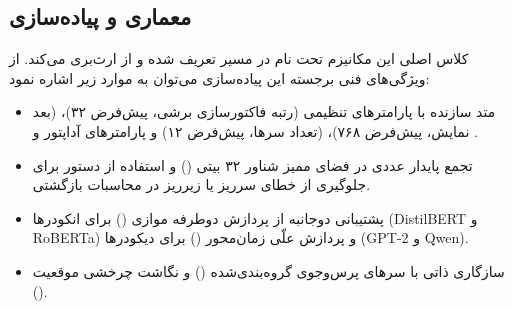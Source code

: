 \subsection{معماری و پیاده‌سازی}
کلاس اصلی این مکانیزم تحت نام  در مسیر  تعریف شده و از  ارث‌بری می‌کند. از ویژگی‌های فنی برجسته این پیاده‌سازی می‌توان به موارد زیر اشاره نمود:
\begin{itemize}
    \item متد سازنده با پارامترهای تنظیمی  (رتبه فاکتورسازی برشی، پیش‌فرض ۳۲)،  (بعد نمایش، پیش‌فرض ۷۶۸)،  (تعداد سرها، پیش‌فرض ۱۲) و پارامترهای آداپتور  و .
    \item تجمع پایدار عددی در فضای ممیز شناور ۳۲ بیتی () و استفاده از دستور  برای جلوگیری از خطای سرریز یا زیرریز در محاسبات بازگشتی.
    \item پشتیبانی دوجانبه از پردازش دوطرفه موازی () برای انکودرها (DistilBERT و RoBERTa) و پردازش علّی زمان‌محور () برای دیکودرها (GPT-2 و Qwen).
    \item سازگاری ذاتی با سرهای پرس‌وجوی گروه‌بندی‌شده () و نگاشت چرخشی موقعیت ().
\end{itemize}
